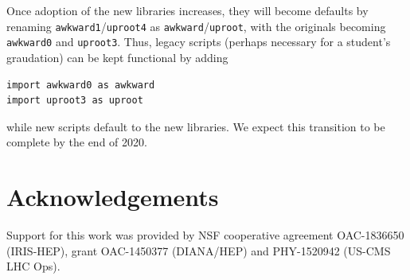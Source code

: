 \documentclass{webofc}
\begin{document}
Once adoption of the new libraries increases, they will become defaults by renaming \texttt{awkward1}/\texttt{uproot4} as \texttt{awkward}/\texttt{uproot}, with the originals becoming \texttt{awkward0} and \texttt{uproot3}. Thus, legacy scripts (perhaps necessary for a student's graudation) can be kept functional by adding

\begin{verbatim}
import awkward0 as awkward
import uproot3 as uproot
\end{verbatim}

\noindent while new scripts default to the new libraries. We expect this transition to be complete by the end of 2020.

\section{Acknowledgements}

Support for this work was provided by NSF cooperative agreement OAC-1836650 (IRIS-HEP), grant OAC-1450377 (DIANA/HEP) and PHY-1520942 (US-CMS LHC Ops).
\end{document}
